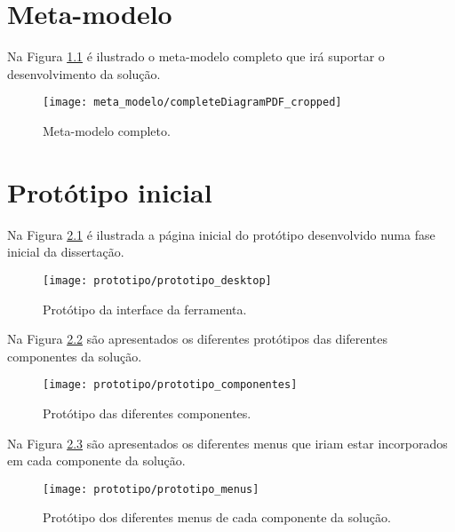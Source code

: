 
%

\chapter{Meta-modelo}
\label{app:meta_modelo_app}

Na Figura \ref{fig:meta_modelo_img} é ilustrado o meta-modelo completo que irá suportar o desenvolvimento da solução.

\begin{figure}[htbp]
  \texttt{[image: meta\_modelo/completeDiagramPDF\_cropped]}
  \centering
  \caption{Meta-modelo completo.}
  \label{fig:meta_modelo_img}
\end{figure}

\chapter{Protótipo inicial}
\label{app:prototipo_inicial}

Na Figura \ref{fig:prototipo_desktop} é ilustrada a página inicial do protótipo desenvolvido numa fase inicial da dissertação.

\begin{figure}[htbp]
  \texttt{[image: prototipo/prototipo\_desktop]}
  \centering
  \caption{Protótipo da interface da ferramenta.}
  \label{fig:prototipo_desktop}
\end{figure}

Na Figura \ref{fig:prototipo_componentes} são apresentados os diferentes protótipos das diferentes componentes da solução.

\begin{figure}[htbp]
  \texttt{[image: prototipo/prototipo\_componentes]}
  \centering
  \caption{Protótipo das diferentes componentes.}
  \label{fig:prototipo_componentes}
\end{figure}

Na Figura \ref{fig:prototipo_menus} são apresentados os diferentes menus que iriam estar incorporados em cada componente da solução.

\begin{figure}[htbp]
  \texttt{[image: prototipo/prototipo\_menus]}
  \centering
  \caption{Protótipo dos diferentes menus de cada componente da solução.}
  \label{fig:prototipo_menus}
\end{figure}